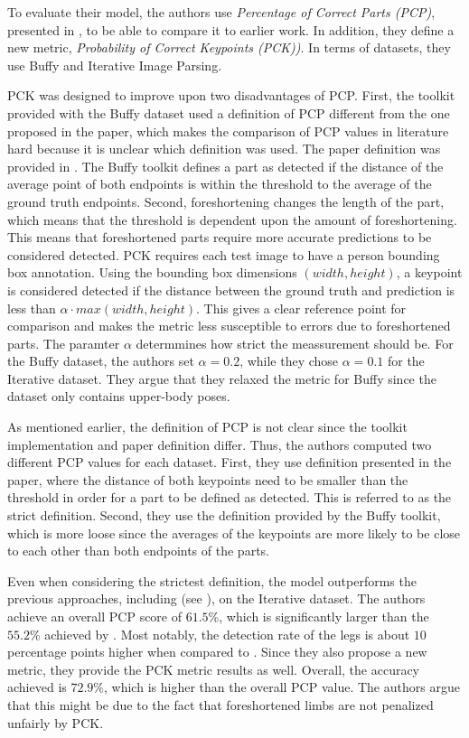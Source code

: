
To evaluate their model, the authors use \textit{Percentage of Correct Parts (PCP)}, presented in , to be able to compare it to earlier work.
In addition, they define a new metric, \textit{Probability of Correct Keypoints (PCK))}.
In terms of datasets, they use Buffy and Iterative Image Parsing. 

PCK was designed to improve upon two disadvantages of PCP.
First, the toolkit provided with the Buffy dataset \cite{ferrari_progressive_2008} used a definition of PCP different from the one proposed in the paper, which makes the comparison of PCP values in literature hard because it is unclear which definition was used.
The paper definition was provided in .
The Buffy toolkit defines a part as detected if the distance of the average point of both endpoints is within the threshold to the average of the ground truth endpoints.
Second, foreshortening changes the length of the part, which means that the threshold is dependent upon the amount of foreshortening.
This means that foreshortened parts require more accurate predictions to be considered detected.
PCK requires each test image to have a person bounding box annotation.
Using the bounding box dimensions $(width, height)$, a keypoint is considered detected if the distance between the ground truth and prediction is less than $\alpha \cdot max(width, height)$.
This gives a clear reference point for comparison and makes the metric less susceptible to errors due to foreshortened parts.
The paramter $\alpha$ determmines how strict the meassurement should be.
For the Buffy dataset, the authors set $\alpha = 0.2$, while they chose $\alpha = 0.1$ for the Iterative dataset.
They argue that they relaxed the metric for Buffy since the dataset only contains upper-body poses.

As mentioned earlier, the definition of PCP is not clear since the toolkit implementation and paper definition differ.
Thus, the authors computed two different PCP values for each dataset.
First, they use definition presented in the paper, where the distance of both keypoints need to be smaller than the threshold in order for a part to be defined as detected.
This is referred to as the strict definition.
Second, they use the definition provided by the Buffy toolkit, which is more loose since the averages of the keypoints are more likely to be close to each other than both endpoints of the parts.

Even when considering the strictest definition, the model outperforms the previous approaches, including \cite{andriluka_pictorial_2009} (see ), on the Iterative dataset.
The authors achieve an overall PCP score of $61.5\%$, which is significantly larger than the $55.2\%$ achieved by \cite{andriluka_pictorial_2009}.
Most notably, the detection rate of the legs is about $10$ percentage points higher when compared to \cite{andriluka_pictorial_2009}.
Since they also propose a new metric, they provide the PCK metric results as well.
Overall, the accuracy achieved is $72.9\%$, which is higher than the overall PCP value.
The authors argue that this might be due to the fact that foreshortened limbs are not penalized unfairly by PCK. 

